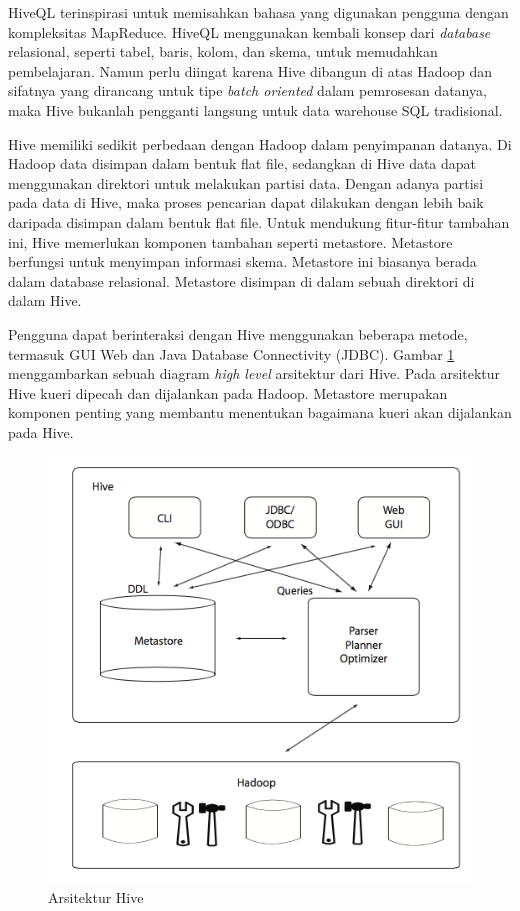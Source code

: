 HiveQL terinspirasi untuk memisahkan bahasa yang digunakan pengguna dengan kompleksitas MapReduce. HiveQL menggunakan kembali konsep dari \textit{database} relasional, seperti tabel, baris, kolom, dan skema, untuk memudahkan pembelajaran. Namun perlu diingat karena Hive dibangun di atas Hadoop dan sifatnya yang dirancang untuk tipe \textit{batch oriented} dalam pemrosesan datanya, maka Hive bukanlah pengganti langsung untuk data warehouse SQL tradisional.

Hive memiliki sedikit perbedaan dengan Hadoop dalam penyimpanan datanya. Di Hadoop data disimpan dalam bentuk flat file, sedangkan di Hive data dapat menggunakan direktori untuk melakukan partisi data. Dengan adanya partisi pada data di Hive, maka proses pencarian dapat dilakukan dengan lebih baik daripada disimpan dalam bentuk flat file. Untuk mendukung fitur-fitur tambahan ini, Hive memerlukan komponen tambahan seperti metastore. Metastore berfungsi untuk menyimpan informasi skema. Metastore ini biasanya berada dalam database relasional. Metastore disimpan di dalam sebuah direktori di dalam Hive.

Pengguna dapat berinteraksi dengan Hive menggunakan beberapa metode, termasuk GUI Web dan Java Database Connectivity (JDBC). Gambar \ref{fig:hive_architecture} menggambarkan sebuah diagram \textit{high level} arsitektur dari Hive. Pada arsitektur Hive kueri dipecah dan dijalankan pada Hadoop. Metastore merupakan komponen penting yang membantu menentukan bagaimana kueri akan dijalankan pada Hive.

\begin{figure}
	\centering
	\includegraphics[scale=0.5]{Gambar/arsitektur-hive.png}
	\caption[Arsitektur Hive]{Arsitektur Hive} 
	\label{fig:hive_architecture}
\end{figure}

